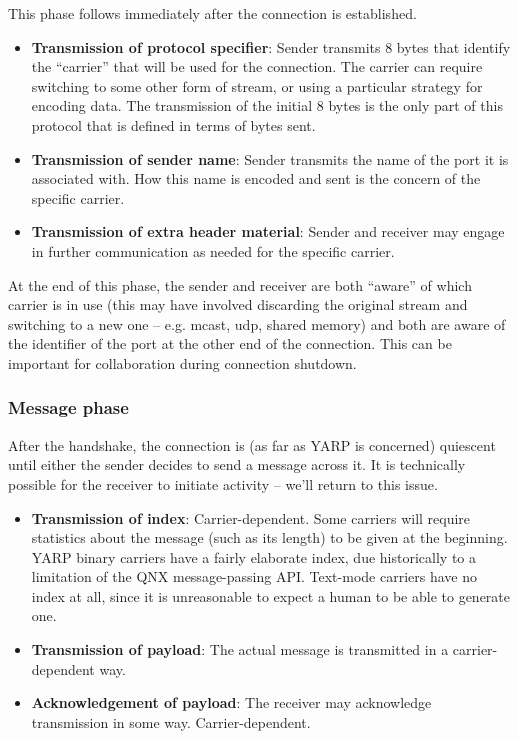 This phase follows immediately after the connection is established.

\begin{itemize}

\item {\bf Transmission of protocol specifier}:
Sender transmits 8 bytes that identify the ``carrier'' that will be
used for the connection.  The carrier can require switching to 
some other form of stream, or using a particular strategy for
encoding data.  The transmission of the initial 8 bytes is the
only part of this protocol that is defined in terms of bytes sent.

\item {\bf Transmission of sender name}: Sender transmits the name of
the port it is associated with.  How this name is encoded and sent is
the concern of the specific carrier.

\item {\bf Transmission of extra header material}: Sender and
receiver may engage in further communication as needed for the
specific carrier.  

\end{itemize}

At the end of this phase, the sender and receiver are both ``aware''
of which carrier is in use (this may have involved discarding the
original stream and switching to a new one -- e.g. mcast, udp, shared
memory) and both are aware of the identifier of the port at the
other end of the connection.  This can be important for collaboration
during connection shutdown.


\subsubsection{Message phase}

After the handshake, the connection is (as far as YARP is concerned)
quiescent until either the sender decides to send a message across it.
It is technically possible for the receiver to initiate activity --
we'll return to this issue.

\begin{itemize}

\item {\bf Transmission of index}: Carrier-dependent. Some carriers
will require statistics about the message (such as its length) to be
given at the beginning.  YARP binary carriers have a fairly elaborate
index, due historically to a limitation of the QNX message-passing
API.  Text-mode carriers have no index at all, since it is
unreasonable to expect a human to be able to generate one.

\item {\bf Transmission of payload}: The actual message is
transmitted in a carrier-dependent way.

\item {\bf Acknowledgement of payload}: The receiver may 
acknowledge transmission in some way.  Carrier-dependent.

\end{itemize}

